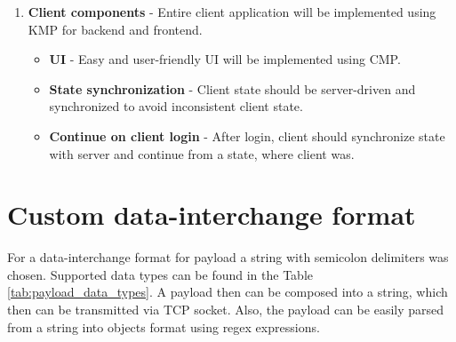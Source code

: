 \documentclass[english, sem, kiv, he, iso690alph, pdf, viewonly]{fasthesis}
\begin{document}
\begin{enumerate}
\begin{itemize}
			\item \textbf{Client timeouts} - if a client has not performed a request for the last \textbf{N} minutes (N is configurable), then the client should be disconnected and related socket should be closed.
			\item \textbf{Invalid client operations} - server should correctly react on any client's invalid operation (malformed request, action which is not possible in the current client state).
			\item \textbf{Client flow state} - each client can be in a one of the flow state: [\textit{LOGIN, MENU, LOBBY, GAME}] \footnote{Described more detailed in the [section ref]}. The client flow state should be synchronized between server and client, and the server value will be the only source of truth \footnote{It means, that a client-side flow state for some reason does not match server-side value, then it should be adjusted on the client side.}.
		\end{itemize}
	\item \textbf{Client components} - Entire client application will be implemented using \ac{KMP} for backend and frontend.
		\begin{itemize}
			\item \textbf{\ac{UI}} - Easy and user-friendly \ac{UI} will be implemented using \ac{CMP}.
			\item \textbf{State synchronization} - Client state should be server-driven and synchronized to avoid inconsistent client state.
			\item \textbf{Continue on client login} - After login, client should synchronize state with server and continue from a state, where client was.
		\end{itemize}
\end{enumerate}

\chapter{Custom data-interchange format}
\label{chap:custom_data_format}

For a data-interchange format for payload a string with semicolon delimiters was chosen. Supported data types can be found in the Table \ref{tab:payload_data_types}. A payload then can be composed into a string, which then can be transmitted via TCP socket. Also, the payload can be easily parsed from a string into objects format using regex expressions.
\end{document}

